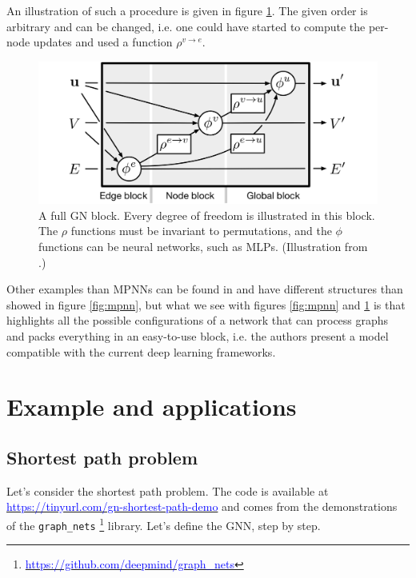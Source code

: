 \documentclass{article}
\begin{document}
An illustration of such a procedure is given in figure \ref{fig:full-gn-block}. The given order is arbitrary and can be changed, i.e. one could have started to compute the per-node updates and used a function $\rho^{v \rightarrow e}$.

\begin{figure}
    \centering
    \includegraphics[scale=.5]{images/GN-full-block.png}
    \caption{A full GN block. Every degree of freedom is illustrated in this block. The $\rho$ functions must be invariant to permutations, and the $\phi$ functions can be neural networks, such as MLPs. (Illustration from \cite{battaglia2018relational}.)}
    \label{fig:full-gn-block}
\end{figure}

Other examples than MPNNs can be found in \cite{battaglia2018relational} and have different structures than showed in figure \ref{fig:mpnn}, but what we see with figures \ref{fig:mpnn} and \ref{fig:full-gn-block} is that \cite{battaglia2018relational} highlights all the possible configurations of a network that can process graphs and packs everything in an easy-to-use block, i.e. the authors present a model compatible with the current deep learning frameworks.



\section{Example and applications}
\label{sec:example-applications}

    \subsection{Shortest path problem}
    \label{subsec:shortest-path}

Let's consider the shortest path problem. The code is available at \href{https://tinyurl.com/gn-shortest-path-demo}{\textcolor{blue}{https://tinyurl.com/gn-shortest-path-demo}} and comes from the demonstrations of the \texttt{graph\_nets} \footnote{\href{https://github.com/deepmind/graph_nets}{\textcolor{blue}{https://github.com/deepmind/graph\_nets}}} library. Let's define the GNN, step by step.
\end{document}
